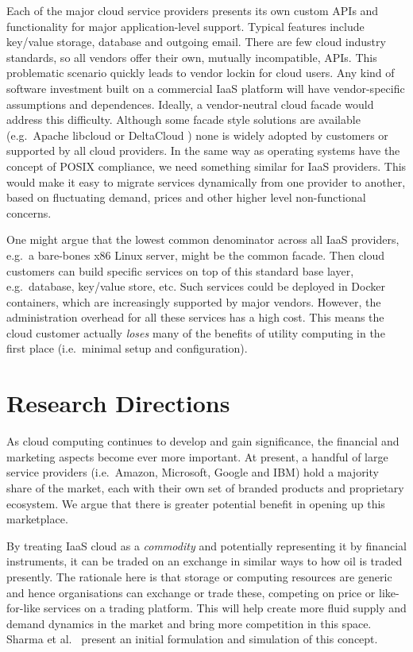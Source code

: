 \documentclass[conference,10pt]{IEEEtran}
\begin{document}
Each of the major cloud service providers presents its own custom APIs and functionality for major application-level support. Typical features include key/value storage, database and outgoing email.
There are few cloud industry standards, so all vendors offer their own, mutually incompatible, APIs.
This problematic scenario quickly leads to vendor lockin for cloud users. Any kind of software investment built on a commercial IaaS platform will have vendor-specific assumptions and dependences. 
Ideally, a vendor-neutral cloud facade \cite{martino15cross} would address this difficulty. Although some facade style solutions are available (e.g.\ Apache libcloud \cite{url5} or DeltaCloud \cite{url6}) none is widely adopted by customers or supported by all cloud providers.
In the same way as operating systems have the concept of POSIX compliance, we need something similar for IaaS providers. This would make it easy to migrate services dynamically from one provider to another, based on fluctuating demand, prices and other higher level non-functional concerns.

One might argue that the lowest common denominator across all IaaS providers, e.g.\ a bare-bones x86 Linux server, might be the common facade. Then cloud customers can build specific services on top of this standard base layer, e.g.\ database, key/value store, etc. Such services could be deployed in Docker containers, which are increasingly supported by major vendors. However, the administration overhead for all these services has a high cost.
This means the cloud customer actually \emph{loses} many of the benefits of utility computing in the first place
(i.e.\ minimal setup and configuration).


\section{Research Directions}
\label{sec-directions}

As cloud computing continues to develop and gain significance, the financial and marketing aspects become ever more important.
At present, a handful of large service providers (i.e.\ Amazon, Microsoft, Google and IBM) hold a majority share of the market, each with their own set of branded products and proprietary ecosystem. We argue that there is greater potential benefit in opening up this marketplace.

By treating IaaS cloud as a \emph{commodity} and potentially representing it by financial instruments, it can be traded on an exchange in similar ways to how oil is traded presently. The rationale here is that storage or computing resources are generic and hence organisations can exchange or trade these, competing on price or like-for-like services on a trading platform. This will help create more fluid supply and demand dynamics in the market and bring more competition in this space. Sharma et al.\ \cite{sharma12pricing} present an initial formulation and simulation of this concept.
\end{document}
